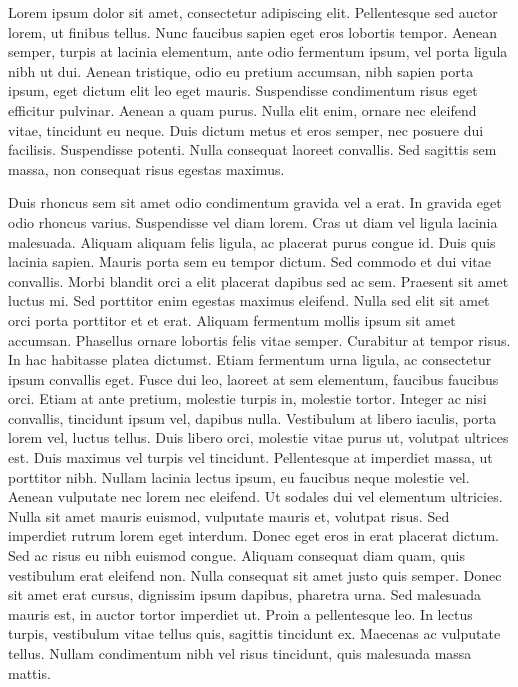 \documentclass{article}
\begin{document}
Lorem ipsum dolor sit amet, consectetur adipiscing elit. Pellentesque sed auctor lorem, ut finibus tellus. Nunc faucibus sapien eget eros lobortis tempor. Aenean semper, turpis at lacinia elementum, ante odio fermentum ipsum, vel porta ligula nibh ut dui. Aenean tristique, odio eu pretium accumsan, nibh sapien porta ipsum, eget dictum elit leo eget mauris. Suspendisse condimentum risus eget efficitur pulvinar. Aenean a quam purus. Nulla elit enim, ornare nec eleifend vitae, tincidunt eu neque. Duis dictum metus et eros semper, nec posuere dui facilisis. Suspendisse potenti. Nulla consequat laoreet convallis. Sed sagittis sem massa, non consequat risus egestas maximus.

Duis rhoncus sem sit amet odio condimentum gravida vel a erat. In gravida eget odio rhoncus varius. Suspendisse vel diam lorem. Cras ut diam vel ligula lacinia malesuada. Aliquam aliquam felis ligula, ac placerat purus congue id. Duis quis lacinia sapien. Mauris porta sem eu tempor dictum. Sed commodo et dui vitae convallis. Morbi blandit orci a elit placerat dapibus sed ac sem. Praesent sit amet luctus mi. Sed porttitor enim egestas maximus eleifend. Nulla sed elit sit amet orci porta porttitor et et erat. Aliquam fermentum mollis ipsum sit amet accumsan. Phasellus ornare lobortis felis vitae semper. Curabitur at tempor risus.
In hac habitasse platea dictumst. Etiam fermentum urna ligula, ac consectetur ipsum convallis eget. Fusce dui leo, laoreet at sem elementum, faucibus faucibus orci. Etiam at ante pretium, molestie turpis in, molestie tortor. Integer ac nisi convallis, tincidunt ipsum vel, dapibus nulla. Vestibulum at libero iaculis, porta lorem vel, luctus tellus. Duis libero orci, molestie vitae purus ut, volutpat ultrices est. Duis maximus vel turpis vel tincidunt. Pellentesque at imperdiet massa, ut porttitor nibh. Nullam lacinia lectus ipsum, eu faucibus neque molestie vel. Aenean vulputate nec lorem nec eleifend. Ut sodales dui vel elementum ultricies.
Nulla sit amet mauris euismod, vulputate mauris et, volutpat risus.
Sed imperdiet rutrum lorem eget interdum. Donec eget eros in erat placerat dictum. Sed ac risus eu nibh euismod congue. Aliquam consequat diam quam, quis vestibulum erat eleifend non. Nulla consequat sit amet justo quis semper. Donec sit amet erat cursus, dignissim ipsum dapibus, pharetra urna. Sed malesuada mauris est, in auctor tortor imperdiet ut. Proin a pellentesque leo. In lectus turpis, vestibulum vitae tellus quis, sagittis tincidunt ex. Maecenas ac vulputate tellus. Nullam condimentum nibh vel risus tincidunt, quis malesuada massa mattis.
\end{document}
